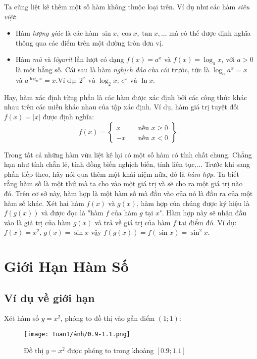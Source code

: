 Ta cũng liệt kê thêm một số hàm không thuộc loại trên.\newline
Ví dụ như các hàm \emph{siêu việt}:\begin{itemize}
    \item Hàm \emph{lượng giác} là các hàm $\sin x,\cos x, \tan x, \dots$ mà có thể được định nghĩa thông qua các điểm trên một đường tròn đơn vị.
    \item Hàm \emph{mũ} và \emph{lôgarit} lần lượt có dạng $f(x) = a^x$ và $f(x) = \log_a x$, với $a > 0$ là một hằng số. Cái sau là hàm \emph{nghịch đảo} của cái trước, tức là $\log_a a^x = x$ và $a^{\log_a x} = x$.\newline Ví dụ: $2^x \text{ và } \log_2 x$; $e^x \text{ và } \ln x$.
\end{itemize}
Hay, hàm xác định từng phần là các hàm được xác định bởi các công thức khác nhau trên các miền khác nhau của tập xác định.\newline
Ví dụ, hàm giá trị tuyệt đối $f(x) = |x|$ được định nghĩa:
\begin{equation*}
    f(x) = \left\{
\begin{aligned}
x  & \quad \text{nếu } x \geq 0 \\
-x   & \quad \text{nếu } x < 0
\end{aligned}
\right\}.
\end{equation*}

Trong tất cả những hàm vừa liệt kê lại có một số hàm có tính chất chung. Chẳng hạn như tính chẵn lẻ, tính đồng biến nghịch biến, tính liên tục,...\newline
Trước khi sang phần tiếp theo, hãy nói qua thêm một khái niệm nữa, đó là \emph{hàm hợp}. Ta biết rằng hàm số là một thứ mà ta cho vào một giá trị và sẽ cho ra một giá trị nào đó. Trên cơ sở này, hàm hợp là một hàm số mà đầu vào của nó là đầu ra của một hàm số khác.\newline
Xét hai hàm $f(x)$ và $g(x)$, hàm hợp của chúng được ký hiệu là $f(g(x))$ và được đọc là "hàm $f$ của hàm $g$ tại $x$". Hàm hợp này sẽ nhận đầu vào là giá trị của hàm $g(x)$ và trả về giá trị của hàm $f$ tại điểm đó.\newline    
Ví dụ: $f(x)=x^2$, $g(x)=\sin x$ vậy $f(g(x))=f(\sin x)=\sin^2 x$.
\section{Giới Hạn Hàm Số}
\subsection{Ví dụ về giới hạn}
Xét hàm số $y=x^2$, phóng to đồ thị vào gần điểm $(1;1)$:
\begin{figure}[h!]
    \centering
    \texttt{[image: Tuan1/ảnh/0.9-1.1.png]}
    \caption{Đồ thị \(y=x^2\) được phóng to trong khoảng $[0.9;1.1]$}
    \label{anh3}
\end{figure}

